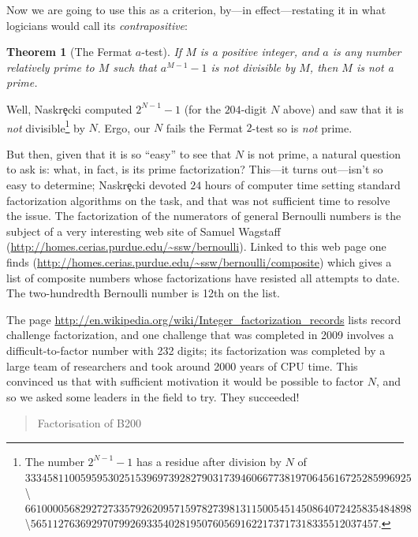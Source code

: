 \documentclass[openany]{book}
\theoremstyle{plain}
\newtheorem{theorem}{Theorem}[chapter]
\theoremstyle{definition}
\begin{document}
{ Now we are going to use this as a criterion, by---in effect---restating it in what logicians would call  its {\it contrapositive}:
 \begin{theorem}[The Fermat $a$-test]
If $M$ is a positive integer, and $a$ is any number relatively prime to $M$ such that  $a^{M-1} - 1$ is {\it not} divisible by $M$, then $M$ is {\it not} a prime.
\end{theorem}

Well, Naskr\c{e}cki computed $2^{N-1}-1$  (for the $204$-digit $N$ above)   and saw that
it is {\it not} divisible\footnote{The number $2^{N-1}-1$ has a residue after division by $N$ of\\ $3334581100595953025153969739282790317394606677381970645616725285996925$\textbackslash\newline$
 6610000568292727335792620957159782739813115005451450864072425835484898$\textbackslash\newline$
 565112763692970799269335402819507605691622173717318335512037457$.} by $N$.
Ergo, our $N$ fails the  Fermat $2$-test so is {\it not} prime.

But then, given that it is so ``easy'' to see that $N$ is not prime, a
natural question to ask is: what, in fact, is its prime factorization?
This---it turns out---isn't so easy to determine;
Naskr\c{e}cki devoted $24$ hours of computer time setting standard factorization
algorithms on the task, and that was not sufficient time to resolve
the issue.  The factorization of the numerators of general Bernoulli
numbers is the subject of a very interesting web site of Samuel
Wagstaff (\url{http://homes.cerias.purdue.edu/~ssw/bernoulli}).
Linked to this web page one finds
(\url{http://homes.cerias.purdue.edu/~ssw/bernoulli/composite}) which gives
a list of composite numbers whose factorizations have resisted all
attempts to date.  The two-hundredth Bernoulli number is 12th on the list.

 The page
\url{http://en.wikipedia.org/wiki/Integer_factorization_records} lists
record challenge factorization, and one challenge that was completed
in 2009 involves a difficult-to-factor number with 232 digits; its
factorization was completed by a large team of researchers and took around
2000 years of CPU time.  This convinced us that
with sufficient motivation  it would be possible to factor $N$, and so we
asked some leaders in the field to try.   They succeeded!
\begin{quote}\sf
Factorisation of B200


\end{quote}}
\end{document}

